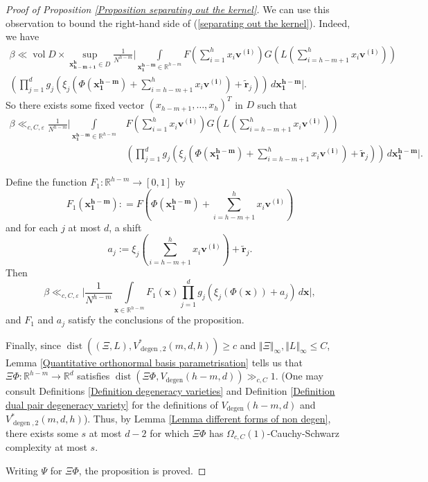 \documentclass[12pt,a4paper,twoside,reqno]{amsart}
\newcommand{\degen}{\operatorname{degen}}
\newcommand{\dist}{\operatorname{dist}}
\numberwithin{equation}{section}
\begin{document}
\begin{proof}[Proof of Proposition \ref{Proposition separating out the kernel}]
We can use this observation to bound the right-hand side of (\ref{separating out the kernel}). Indeed, we have 
\begin{align}
\label{equation bound beta by a sup}
\beta \ll \operatorname{vol} D \times \sup\limits_{\mathbf{x_{h-m+1}^h}\in D}\frac{1}{N^{h-m}} \Big\vert \int\limits_{\mathbf{x_{1}^{h-m}} \in \mathbb{R}^{h-m}} F(\sum\limits_{i=1}^{h}x_i\mathbf{v^{(i)}})G(L(\sum\limits_{i=h-m+1}^{h}x_i\mathbf{v^{(i)}})) \nonumber\\
(\prod\limits_{j=1}^{d} g_j(\xi_j(\Phi(\mathbf{x_{1}^{h-m}})+\sum\limits_{i=h-m+1}^{h} x_i\mathbf{v}^{\mathbf{(i)}})+ \widetilde{\mathbf{r}}_j)) \, d \mathbf{x_1^{h-m}} \Big\vert.
\end{align} So there exists some fixed vector $(x_{h-m+1},\dots,x_h)^T$ in $D$ such that \begin{align}
\label{equation bound beta second}
\beta \ll_{c,C,\varepsilon}\frac{1}{N^{h-m}} \Big\vert \int\limits_{\mathbf{x_{1}^{h-m}} \in \mathbb{R}^{h-m}} &F(\sum\limits_{i=1}^{h}x_i\mathbf{v^{(i)}})G(L(\sum\limits_{i=h-m+1}^{h}x_i\mathbf{v^{(i)}})) \nonumber\\
&(\prod\limits_{j=1}^{d} g_j(\xi_j(\Phi(\mathbf{x_{1}^{h-m}})+\sum\limits_{i=h-m+1}^{h} x_i\mathbf{v}^{\mathbf{(i)}})+ \widetilde{\mathbf{r}}_j)) \, d \mathbf{x_1^{h-m}} \Big\vert. 
\end{align}  

Define the function $F_1:\mathbb{R}^{h-m} \longrightarrow [0,1]$ by \[ F_1(\mathbf{x_1^{h-m}}) : = F(\Phi(\mathbf{x_1^{h-m}}) + \sum\limits_{i=h-m+1}^{h} x_i\mathbf{v^{(i)}})\] and for each $j$ at most $d$, a shift \[a_j :=\xi_j(\sum\limits_{i=h-m+1}^{h} x_i \mathbf{v}^{\mathbf{(i)}}) + \widetilde{\mathbf{r}}_j.\] Then
\begin{equation}
\label{just before we put everything into normal form}
\beta \ll _{c,C,\varepsilon}\Big\vert\frac{1}{N^{h-m}}\int\limits_{\mathbf{x} \in \mathbb{R}^{h-m}}F_1(\mathbf{x}) \prod\limits_{j=1}^d g_j(\xi_j(\Phi(\mathbf{x}))+a_j) \, d\mathbf{x}\Big\vert,
\end{equation} 
\noindent and $F_1$ and $a_j$ satisfy the conclusions of the proposition.

Finally, since $\dist((\Xi,L), V_{\degen,2}^*(m,d,h)) \geqslant c$ and $\Vert \Xi\Vert_\infty, \Vert L\Vert_\infty \leqslant C$, Lemma \ref{Quantitative orthonormal basis parametrisation} tells us that $\Xi\Phi: \mathbb{R}^{h-m}\longrightarrow \mathbb{R}^d$ satisfies $\dist(\Xi\Phi, V_{\degen}(h-m,d))\gg_{c,C} 1$. (One may consult Definitions \ref{Definition degeneracy varieties} and Definition \ref{Definition dual pair degeneracy variety} for the definitions of $V_{\degen}(h-m,d)$ and $V_{\degen,2}^*(m,d,h)$). Thus, by Lemma \ref{Lemma different forms of non degen}, there exists some $s$ at most $d-2$ for which $\Xi\Phi$ has $\Omega_{c,C}(1)$-Cauchy-Schwarz complexity at most $s$. 

Writing $\Psi$ for $\Xi\Phi$, the proposition is proved. 
\end{proof}
\end{document}
